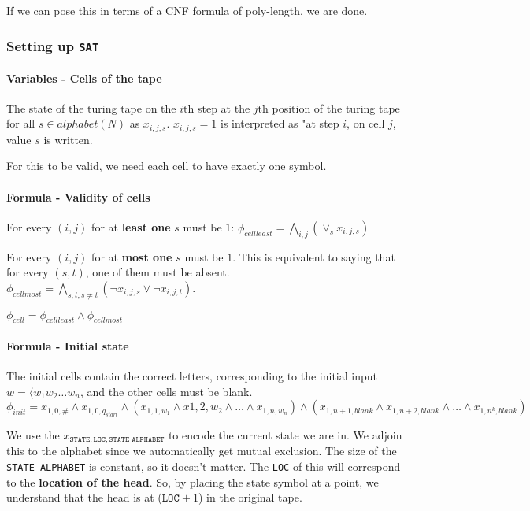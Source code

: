 If we can pose this in terms of a CNF formula of poly-length, we are done.

\subsubsection{Setting up \texttt{SAT}}

\paragraph{\textbf{Variables - Cells of the tape}}
The state of the turing tape on the $i$th step at the $j$th position of the
turing tape for all $s \in alphabet(N)$ as $x_{i, j, s}$. $x_{i, j, s} = 1$
is interpreted as "at step $i$, on cell $j$, value $s$ is written.

For this to be valid, we need each cell to have exactly one symbol.


\paragraph{\textbf{Formula - Validity of cells}}
For every $(i, j)$ for at \textbf{least one} $s$ must be $1$:
$\phi_{cell least} = \bigwedge\limits_{i, j} (\lor_s x_{i, j, s})$


For every $(i, j)$ for at \textbf{most one} $s$ must be $1$. This is equivalent
to saying that for every $(s, t)$, one of them must be absent.
$\phi_{cell most} = \bigwedge\limits_{s, t, s \neq t} (\lnot{x_{i, j, s}} \lor \lnot{x_{i, j, t}})$.

$\phi_{cell} = \phi_{cell least} \land \phi_{cell most}$


\paragraph{\textbf{Formula - Initial state}}
The initial cells contain the correct letters, corresponding to the initial
input $w = \langle w_1 w_2 \dots w_n$, and the other cells must be blank.
$\phi_{init} = x_{1, 0, \#} \land x_{1, 0, q_{start}} \land (x_{1, 1, w_1} \land x{1, 2, w_2} \land \dots \land x_{1, n, w_n}) \land (x_{1, n + 1, blank} \land x_{1, n + 2, blank} \land \dots \land x_{1, n^k, blank})$

We use the $x_{\texttt{STATE}, \texttt{LOC}, \texttt{STATE ALPHABET}}$ to encode the current state
we are in. We adjoin this to the alphabet since we automatically get mutual
exclusion. The size of the \texttt{STATE ALPHABET} is constant, so it doesn't
matter. The \texttt{LOC} of this will correspond to the \textbf{location of the head}.
So, by placing the state symbol at a point, we understand that the head is at
($\texttt{LOC} + 1$) in the original tape.



